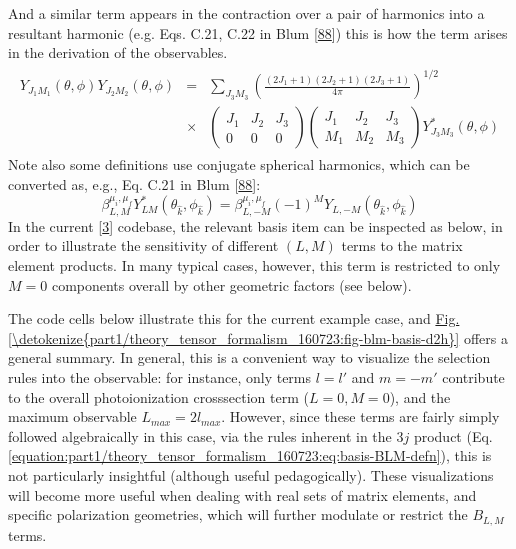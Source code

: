 \documentclass[letterpaper,table,10pt,english]{jupyterBook}
\begin{document}
\sphinxAtStartPar
And a similar term appears in the contraction over a pair of harmonics into a resultant harmonic (e.g. Eqs. C.21, C.22 in Blum {[}\hyperlink{cite.backmatter/bibliography:id525}{88}{]}) \sphinxhyphen{} this is how the term arises in the derivation of the observables.
\begin{equation*}
\begin{split}
\begin{aligned}
Y_{J_{1}M_{1}}(\theta,\phi)Y_{J_{2}M_{2}}(\theta,\phi) & = & \sum_{J_{3}M_{3}}\left(\frac{(2J_{1}+1)(2J_{2}+1)(2J_{3}+1)}{4\pi}\right)^{1/2}\\
 & \times & \left(\begin{array}{ccc}
J_{1} & J_{2} & J_{3}\\
0 & 0 & 0
\end{array}\right)\left(\begin{array}{ccc}
J_{1} & J_{2} & J_{3}\\
M_{1} & M_{2} & M_{3}
\end{array}\right)Y_{J_{3}M_{3}}^{*}(\theta,\phi)
\end{aligned}
\end{split}
\end{equation*}
\sphinxAtStartPar
Note also some definitions use conjugate spherical harmonics, which can be converted as, e.g., Eq. C.21 in Blum {[}\hyperlink{cite.backmatter/bibliography:id525}{88}{]}:
\label{equation:part1/theory_tensor_formalism_160723:29bafd47-2961-470c-8da8-35d5423c3b15}\begin{equation}
\beta_{L,M}^{\mu_{i},\mu_{f}}Y_{LM}^{*}(\theta_{\hat{k}},\phi_{\hat{k}})=\beta_{L,-M}^{\mu_{i},\mu_{f}}(-1)^{M}Y_{L,-M}(\theta_{\hat{k}},\phi_{\hat{k}})\label{eq:sph-conj-conv}
\end{equation}
\sphinxAtStartPar
In the current  {[}\hyperlink{cite.backmatter/bibliography:id668}{3}{]} codebase, the relevant basis item can be inspected as below, in order to illustrate the sensitivity of different \((L,M)\) terms to the matrix element products. In many typical cases, however, this term is restricted to only \(M=0\) components overall by other geometric factors (see below).

\sphinxAtStartPar
The code cells below illustrate this for the current example case, and \hyperref[\detokenize{part1/theory_tensor_formalism_160723:fig-blm-basis-d2h}]{Fig.\@ \ref{\detokenize{part1/theory_tensor_formalism_160723:fig-blm-basis-d2h}}} offers a general summary. In general, this is a convenient way to visualize the selection rules into the observable: for instance, only terms \(l=l'\) and \(m=-m'\) contribute to the overall photoionization cross\sphinxhyphen{}section term (\(L=0, M=0\)), and the maximum observable \(L_{max}=2l_{max}\). However, since these terms are fairly simply followed algebraically in this case, via the rules inherent in the \(3j\) product (Eq. \eqref{equation:part1/theory_tensor_formalism_160723:eq:basis-BLM-defn}), this is not particularly insightful (although useful pedagogically). These visualizations will become more useful when dealing with real sets of matrix elements, and specific polarization geometries, which will further modulate or restrict the \(B_{L,M}\) terms.
\end{document}
